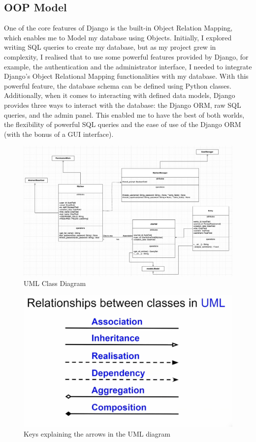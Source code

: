 \subsection{OOP Model}
One of the core features of Django is the built-in Object Relation Mapping, which enables me to Model my database using Objects. Initially, I explored writing SQL queries to create my database, but as my project grew in complexity, I realised that to use some powerful features provided by Django, for example, the authentication and the administrator interface, I needed to integrate Django's Object Relational Mapping functionalities with my database. With this powerful feature, the database schema can be defined using Python classes. Additionally, when it comes to interacting with defined data models, Django provides three ways to interact with the database: the Django ORM, raw SQL queries, and the admin panel. This enabled me to have the best of both worlds, the flexibility of powerful SQL queries and the ease of use of the Django ORM (with the bonus of a GUI interface).


\begin{figure}[!hbt]
    \centering
    \includegraphics[width=\linewidth]{Assets/UML.png}
    \caption{UML Class Diagram}
    \label{fig:UML}
\end{figure}

\begin{figure}
    \centering
    \includegraphics[width=\linewidth]{Assets/UML_keys.png}
    \caption{Keys explaining the arrows in the UML diagram \cite{carnes2021uml}}
\end{figure}

